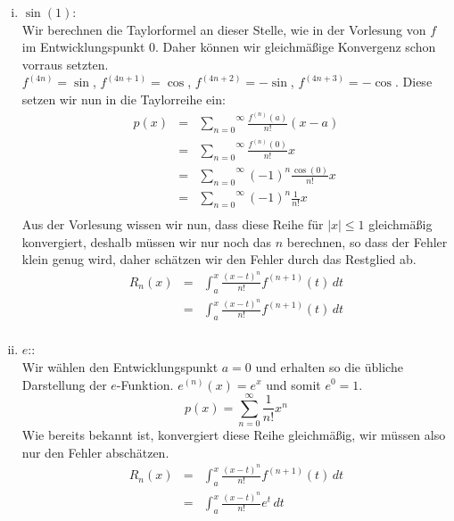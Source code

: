 \documentclass[11pt,a4paper,ngerman]{article}
\begin{document}
\begin{enumerate}[(i)]
    \item $\sin (1)$:\\
        Wir berechnen die Taylorformel an dieser Stelle, wie in der Vorlesung von $f$ im Entwicklungspunkt
        $0$. Daher können wir gleichmäßige Konvergenz schon vorraus setzten.\\
        $f^{(4n)} = \sin$, $f^{(4n+1)} = \cos$, $f^{(4n+2)} = -\sin$, $f^{(4n+3)} = -\cos$. Diese
        setzen wir nun in die Taylorreihe ein:
        $$\begin{array}{rcl}
            p(x) &=& \overset{\infty}{\underset{n=0}{\sum}} \frac{f^{(n)}(a)}{n!}(x-a)\\
                &=&  \overset{\infty}{\underset{n=0}{\sum}} \frac{f^{(n)}(0)}{n!}x\\
                &=& \overset{\infty}{\underset{n=0}{\sum}} (-1)^{n}\frac{\cos(0)}{n!}x\\
                &=& \overset{\infty}{\underset{n=0}{\sum}} (-1)^{n}\frac{1}{n!}x\\
        \end{array}$$
        Aus der Vorlesung wissen wir nun, dass diese Reihe für $|x|\leq1$ gleichmäßig konvergiert,
        deshalb müssen wir nur noch das $n$ berechnen, so dass der Fehler klein genug wird,
        daher schätzen wir den Fehler durch das Restglied ab.\\
        $$\begin{array}{rcl}
            R_n(x) &=& \int_{a}^{x} \frac{(x-t)^n}{n!}f^{(n+1)}(t) \, dt\\
                &=&  \int_{a}^{x} \frac{(x-t)^n}{n!}f^{(n+1)}(t) \, dt\\
        \end{array}$$
    \item $e$::\\
        Wir wählen den Entwicklungspunkt $a=0$ und erhalten so die übliche Darstellung der $e$-Funktion.
        $e^{(n)}(x) = e^x$ und somit $e^0 = 1$.\\
        $$
            p(x) = \overset{\infty}{\underset{n=0}{\sum}} \frac{1}{n!}x^n
        $$
        Wie bereits bekannt ist, konvergiert diese Reihe gleichmäßig, wir müssen also nur den Fehler
        abschätzen.
        $$\begin{array}{rcl}
            R_n(x) &=& \int_a^x \frac{(x-t)^n}{n!} f^{(n+1)}(t) \, dt \\
                &=& \int_a^x \frac{(x-t)^n}{n!}e^t \, dt\\

\end{array}$$
\end{enumerate}
\end{document}
